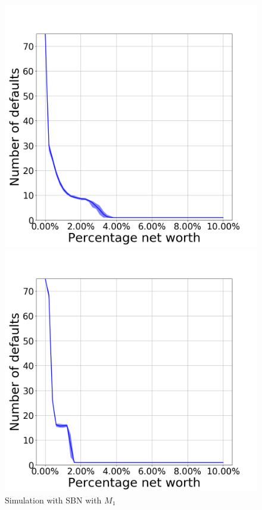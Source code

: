 \documentclass[14pt]{article}
\begin{document}
\begin{figure}[!htb]
  \includegraphics[width=\linewidth]{Figure_1N75pin40pex10.png}
  \caption{Simulation with SBN with $M_1$}\label{fig:7}
\endminipage\hfill
{}
  \includegraphics[width=\linewidth]{Figure_1_N75.png}

\end{figure}
\end{document}

